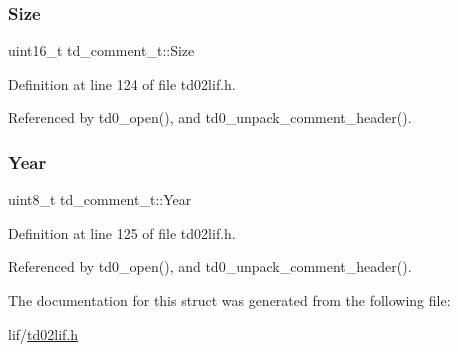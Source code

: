 \subsubsection{\texorpdfstring{Size}{Size}}
{\footnotesize\ttfamily uint16\+\_\+t td\+\_\+comment\+\_\+t\+::\+Size}



Definition at line 124 of file td02lif.\+h.



Referenced by td0\+\_\+open(), and td0\+\_\+unpack\+\_\+comment\+\_\+header().

\mbox{\label{structtd__comment__t_a0c804ec07303f411dd508dc64900aff5}} 
\subsubsection{\texorpdfstring{Year}{Year}}
{\footnotesize\ttfamily uint8\+\_\+t td\+\_\+comment\+\_\+t\+::\+Year}



Definition at line 125 of file td02lif.\+h.



Referenced by td0\+\_\+open(), and td0\+\_\+unpack\+\_\+comment\+\_\+header().



The documentation for this struct was generated from the following file\+:\begin{DoxyCompactItemize}
\item 
lif/\hyperlink{td02lif_8h}{td02lif.\+h}\end{DoxyCompactItemize}
